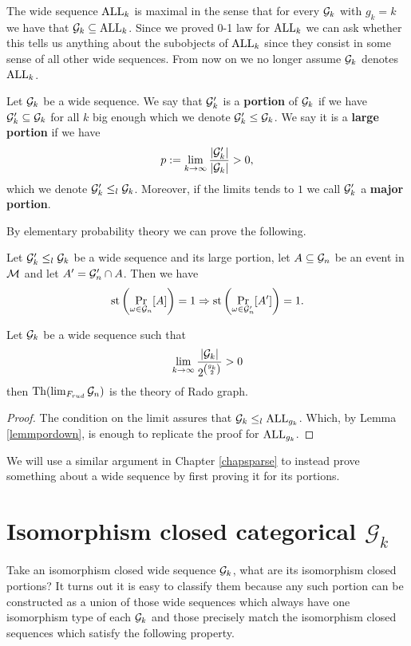 The wide sequence $\text{ALL}_k$ is maximal in the sense that for every $\mathcal{G}_k$ with $g_k=k$ we have that $\mathcal{G}_{k}\subseteq \text{ALL}_{k}$. Since we proved 0-1 law for $\text{ALL}_k$ we can ask whether this tells us anything about the subobjects of $\text{ALL}_k$ since they consist in some sense of all other wide sequences. From now on we no longer assume $\mathcal{G}_k$ denotes $\text{ALL}_k$.

\begin{defi}\label{defiportion}
Let $\mathcal{G}_k$ be a wide sequence. We say that $\mathcal{G}_k'$ is a \textbf{portion} of $\mathcal{G}_k$ if we have $\mathcal{G}_k'\subseteq \mathcal{G}_k$ for all $k$ big enough which we denote $\mathcal{G}_k'\leq \mathcal{G}_k$. We say it is a \textbf{large portion} if we have
\[p:=\lim_{k\to\infty}\frac{\left|{\mathcal{G}_k'}\right|}{\left|{\mathcal{G}_k}\right|}>0,\]
which we denote $\mathcal{G}_k' \leq_l \mathcal{G}_k$. Moreover, if the limits tends to $1$ we call $\mathcal{G}_k'$ a \textbf{major portion}.
\end{defi}

By elementary probability theory we can prove the following.

\begin{lemm}\label{lemmpordown}
Let $\mathcal{G}_k'\leq_l \mathcal{G}_k$ be a wide sequence and its large portion, let $A\subseteq \mathcal{G}_n$ be an event in $\mathcal{M}$ and let $A'=\mathcal{G}_n'\cap A$. Then we have
\[\text{st}\left(\Pr_{\omega\in\mathcal{G}_n}[A]\right)=1 \Rightarrow \text{st}\left(\Pr_{\omega\in\mathcal{G}_n'}[A']\right)=1.\]
\end{lemm}


\begin{crll}\label{crlltoobig}
Let $\mathcal{G}_k$ be a wide sequence such that 
\[\lim_{k\to\infty}\frac{\left|{\mathcal{G}_k}\right|}{2^{\binom{g_k}{2}}}>0\] then $\text{Th}(\lim_{F_{rud}}\mathcal{G}_n)$ is the theory of Rado graph.
\end{crll}
\begin{proof}
The condition on the limit assures that $\mathcal{G}_k\leq_l \text{ALL}_{g_k}$. Which, by Lemma \ref{lemmpordown}, is enough to replicate the proof for $\text{ALL}_{g_k}$.
\end{proof}

We will use a similar argument in Chapter \ref{chapsparse} to instead prove something about a wide sequence by first proving it for its portions. 

\section{Isomorphism closed categorical \texorpdfstring{$\mathcal{G}_k$}{Gk}}

Take an isomorphism closed wide sequence $\mathcal{G}_k$, what are its isomorphism closed portions? It turns out it is easy to classify them because any such portion can be constructed as a union of those wide sequences which always have one isomorphism type of each $\mathcal{G}_k$ and those precisely match the isomorphism closed sequences which satisfy the following property.

